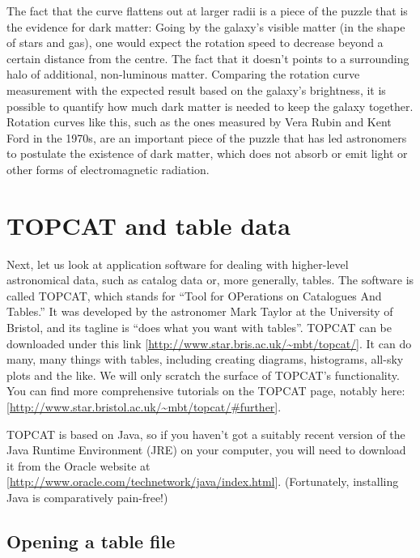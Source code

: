\documentclass[twocolumn,apj]{openjournal}
\begin{document}
The fact that the curve flattens out at larger radii is a piece of the puzzle that is the evidence for dark matter: Going by the galaxy's visible matter (in the shape of stars and gas), one would expect the rotation speed to decrease beyond a certain distance from the centre. The fact that it doesn't points to a surrounding halo of additional, non-luminous matter. Comparing the rotation curve measurement with the expected result based on the galaxy's brightness, it is possible to quantify how much dark matter is needed to keep the galaxy together. Rotation curves like this, such as the ones measured by Vera Rubin and Kent Ford in the 1970s, are an important piece of the puzzle that has led astronomers to postulate the existence of dark matter, which does not absorb or emit light or other forms of electromagnetic radiation.

\section{TOPCAT and table data}
\label{TOPCAT}

Next, let us look at application software for dealing with higher-level astronomical data, such as catalog data or, more generally, tables. The software is called TOPCAT, which stands for ``Tool for OPerations on Catalogues And Tables.'' It was developed by the astronomer Mark Taylor at the University of Bristol, and its tagline is ``does what you want with tables''. TOPCAT can be downloaded under this link [\href{http://www.star.bris.ac.uk/~mbt/topcat/}{http://www.star.bris.ac.uk/\~{}mbt/topcat/}]. It can do many, many things with tables, including creating diagrams, histograms, all-sky plots and the like. We will only scratch the surface of TOPCAT's functionality. You can find more comprehensive tutorials on the TOPCAT page, notably here: [\href{http://www.star.bristol.ac.uk/~mbt/topcat/#further}{http://www.star.bristol.ac.uk/\~{}mbt/topcat/\#further}].

TOPCAT is based on Java, so if you haven't got a suitably recent version of the Java Runtime Environment (JRE) on your computer, you will need to download it from the Oracle website at [\href{http://www.oracle.com/technetwork/java/index.html}{http://www.oracle.com/technetwork/java/index.html}]. (Fortunately, installing Java is comparatively pain-free!)

\subsection{Opening a table file}
\label{TOPCATOpenTable}
\end{document}
